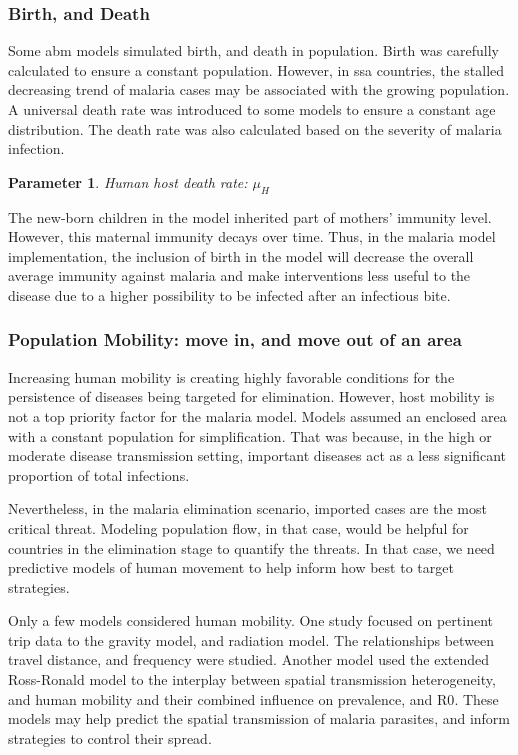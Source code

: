 \documentclass[a4paper, 12pt, twoside]{article}
\newtheorem{parameter}{Parameter}
\begin{document}
\subsubsection{Birth, and Death}
Some \gls{abm} models simulated birth, and death in population.
Birth was carefully calculated to ensure a constant population.
However, in \gls{ssa} countries, the stalled decreasing trend of malaria cases may be associated with the growing population.
A universal death rate was introduced to some models  to ensure a constant age distribution.
The death rate was also calculated based on the severity of malaria infection.
\begin{parameter}
	{Human host death rate:}
	{$\mu_H$}
\end{parameter}
The new-born children in the model inherited part of mothers' immunity level.
However, this maternal immunity decays over time.
Thus, in the malaria model implementation, the inclusion of birth in the model will decrease the overall average immunity against malaria and make interventions less useful to the disease due to a higher possibility to be infected after an infectious bite.

\subsubsection{Population Mobility: move in, and move out of an area}
Increasing human mobility is creating highly favorable conditions for the persistence of diseases being targeted for elimination.
However, host mobility is not a top priority factor for the malaria model.
Models assumed an enclosed area with a constant population for simplification.
That was because, in the high or moderate disease transmission setting, important diseases act as a less significant proportion of total infections.

Nevertheless, in the malaria elimination scenario, imported cases are the most critical threat.
Modeling population flow, in that case, would be helpful for countries in the elimination stage to quantify the threats.
In that case, we need predictive models of human movement to help inform how best to target strategies.

Only a few models\cite{Zhu2015a} considered human mobility.
One study focused on pertinent trip data to the gravity model, and radiation model\cite{Marshall2018}.
The relationships between travel distance, and frequency were studied.
Another model\cite{acevedo_spatial_2015} used the extended Ross-Ronald model to the interplay between spatial transmission heterogeneity, and human mobility and their combined influence on prevalence, and \gls{R0}.
These models may help predict the spatial transmission of malaria parasites, and inform strategies to control their spread.
\end{document}
